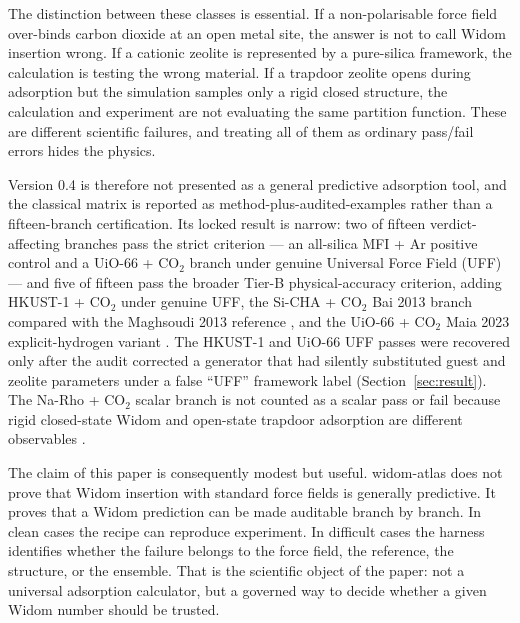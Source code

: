 The distinction between these classes is essential. If a non-polarisable force field over-binds carbon dioxide at an open metal site, the answer is not to call Widom insertion wrong. If a cationic zeolite is represented by a pure-silica framework, the calculation is testing the wrong material. If a trapdoor zeolite opens during adsorption but the simulation samples only a rigid closed structure, the calculation and experiment are not evaluating the same partition function. These are different scientific failures, and treating all of them as ordinary pass/fail errors hides the physics.

Version 0.4 is therefore not presented as a general predictive adsorption tool, and the classical matrix is reported as method-plus-audited-examples rather than a fifteen-branch certification. Its locked result is narrow: two of fifteen verdict-affecting branches pass the strict criterion --- an all-silica MFI + Ar positive control \cite{Talu2001,Dunne1996Langmuir} and a UiO-66 + CO\(_2\) branch under genuine Universal Force Field (UFF) --- and five of fifteen pass the broader Tier-B physical-accuracy criterion, adding HKUST-1 + CO\(_2\) under genuine UFF, the Si-CHA + CO\(_2\) Bai 2013 branch compared with the Maghsoudi 2013 reference \cite{Bai2013JPCC,Maghsoudi2013Adsorption}, and the UiO-66 + CO\(_2\) Maia 2023 explicit-hydrogen variant \cite{Maia2023Crystals,Cmarik2012Langmuir}. The HKUST-1 and UiO-66 UFF passes were recovered only after the audit corrected a generator that had silently substituted guest and zeolite parameters under a false ``UFF'' framework label (Section~\ref{sec:result}). The Na-Rho + CO\(_2\) scalar branch is not counted as a scalar pass or fail because rigid closed-state Widom and open-state trapdoor adsorption are different observables \cite{Lozinska2012JACS,Coudert2017ChemMater}.

The claim of this paper is consequently modest but useful. widom-atlas does not prove that Widom insertion with standard force fields is generally predictive. It proves that a Widom prediction can be made auditable branch by branch. In clean cases the recipe can reproduce experiment. In difficult cases the harness identifies whether the failure belongs to the force field, the reference, the structure, or the ensemble. That is the scientific object of the paper: not a universal adsorption calculator, but a governed way to decide whether a given Widom number should be trusted.

